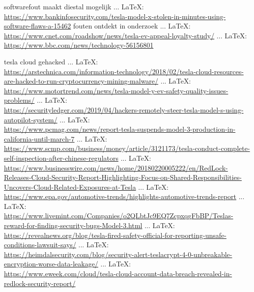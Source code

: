 \begin{thebibliography}{99}
{{{{softwarefout maakt diestal mogelijk
 ... \LaTeX:\\ \url{https://www.bankinfosecurity.com/tesla-model-x-stolen-in-minutes-using-software-flaws-a-15462}
fouten ontdekt in onderzoek
 ... \LaTeX:\\ \url{https://www.cnet.com/roadshow/news/tesla-ev-appeal-loyalty-study/}
 ... \LaTeX:\\ \url{https://www.bbc.com/news/technology-56156801}








tesla cloud gehacked
 ... \LaTeX:\\ \url{https://arstechnica.com/information-technology/2018/02/tesla-cloud-resources-are-hacked-to-run-cryptocurrency-mining-malware/}
 ... \LaTeX:\\ \url{https://www.motortrend.com/news/tesla-model-y-ev-safety-quality-issues-problems/}
 ... \LaTeX:\\ \url{https://securityledger.com/2019/04/hackers-remotely-steer-tesla-model-s-using-autopilot-system/}
 ... \LaTeX:\\ \url{https://www.pcmag.com/news/report-tesla-suspends-model-3-production-in-california-until-march-7}
 ... \LaTeX:\\ \url{https://www.scmp.com/business/money/article/3121173/tesla-conduct-complete-self-inspection-after-chinese-regulators}
 ... \LaTeX:\\ \url{https://www.businesswire.com/news/home/20180220005222/en/RedLock-Releases-Cloud-Security-Report-Highlighting-Focus-on-Shared-Responsibilities-Uncovers-Cloud-Related-Exposures-at-Tesla}
 ... \LaTeX:\\ \url{https://www.epa.gov/automotive-trends/highlights-automotive-trends-report}
 ... \LaTeX:\\ \url{https://www.livemint.com/Companies/o2QLbtJc9EQ7ZcpxqgFbBP/Teslas-reward-for-finding-security-bugs-Model-3.html}
 ... \LaTeX:\\ \url{https://revealnews.org/blog/tesla-fired-safety-official-for-reporting-unsafe-conditions-lawsuit-says/}
 ... \LaTeX:\\ \url{https://heimdalsecurity.com/blog/security-alert-teslacrypt-4-0-unbreakable-encryption-worse-data-leakage/}
 ... \LaTeX:\\ \url{https://www.eweek.com/cloud/tesla-cloud-account-data-breach-revealed-in-redlock-security-report/}
}}}}
\end{thebibliography}
